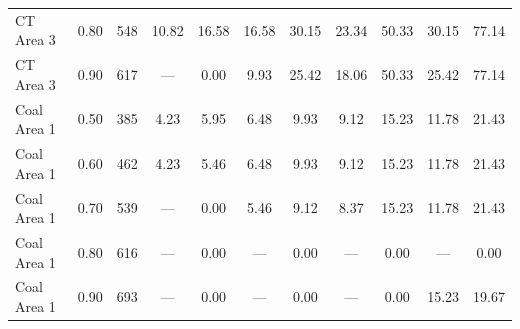 \documentclass[10pt,a4paper]{article}
\begin{document}
\begin{table}[htbp]
\begin{tabular*}{\textwidth}{@{\extracolsep{\fill}}lcc|cc|cc|cc|cc@{}}
CT Area 3 & 0.80 & 548 & 10.82 & 16.58 & 16.58 & 30.15 & 23.34 & 50.33 & 30.15 & 77.14 \\
CT Area 3 & 0.90 & 617 & --- & 0.00 & 9.93 & 25.42 & 18.06 & 50.33 & 25.42 & 77.14 \\
\midrule
Coal Area 1 & 0.50 & 385 & 4.23 & 5.95 & 6.48 & 9.93 & 9.12 & 15.23 & 11.78 & 21.43 \\
Coal Area 1 & 0.60 & 462 & 4.23 & 5.46 & 6.48 & 9.93 & 9.12 & 15.23 & 11.78 & 21.43 \\
Coal Area 1 & 0.70 & 539 & --- & 0.00 & 5.46 & 9.12 & 8.37 & 15.23 & 11.78 & 21.43 \\
Coal Area 1 & 0.80 & 616 & --- & 0.00 & --- & 0.00 & --- & 0.00 & --- & 0.00 \\
Coal Area 1 & 0.90 & 693 & --- & 0.00 & --- & 0.00 & --- & 0.00 & 15.23 & 19.67 \\
\bottomrule
\end{tabular*}
\end{table}
\end{document}
